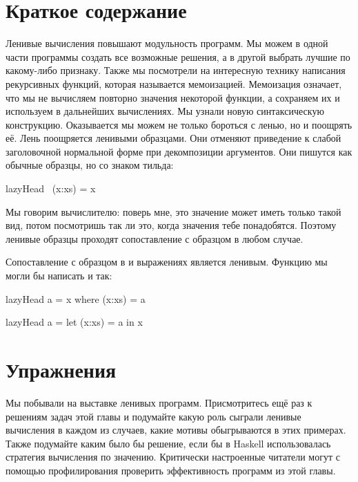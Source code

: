 \section{Краткое содержание}

Ленивые вычисления повышают модульность программ. 
Мы можем в одной части программы создать все возможные
решения, а в другой выбрать лучшие по какому-либо признаку.
Также мы посмотрели на интересную технику написания 
рекурсивных функций, которая называется мемоизацией. 
Мемоизация означает, что мы не вычисляем повторно значения 
некоторой функции, а сохраняем их и используем в дальнейших
вычислениях. 
Мы узнали новую синтаксическую конструкцию.
Оказывается мы можем не только бороться с ленью, но и поощрять её.
Лень поощряется ленивыми образцами. Они отменяют приведение
к слабой заголовочной нормальной форме при декомпозиции
аргументов. Они пишутся как обычные образцы, но со знаком тильда:

\begin{code}
lazyHead ~(x:xs) = x
\end{code}

Мы говорим вычислителю: поверь мне, это значение может иметь
только такой вид, потом посмотришь так ли это, когда
значения тебе понадобятся. Поэтому ленивые образцы проходят 
сопоставление с образцом в любом случае. 

Сопоставление с образцом в  и  
выражениях является ленивым. Функцию  
мы могли бы написать и так:

\begin{code}
lazyHead a = x
    where (x:xs) = a

lazyHead a = 
    let (x:xs) = a
    in  x
\end{code}


\section{Упражнения}

Мы побывали на выставке ленивых программ.
Присмотритесь ещё раз к решениям задач этой главы
и подумайте какую роль сыграли ленивые вычисления
в каждом из случаев, какие мотивы обыгрываются в этих примерах.
Также подумайте каким было бы решение, если бы в Haskell
использовалась стратегия вычисления по значению.
Критически настроенные читатели могут с помощью профилирования
проверить эффективность программ из этой главы.

